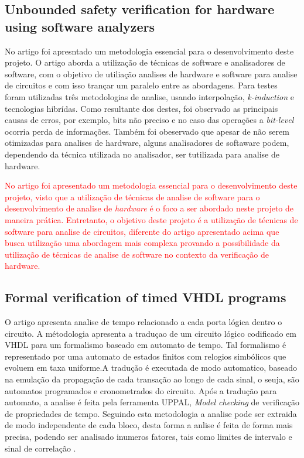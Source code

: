 \subsection{Unbounded safety verification for hardware using software analyzers}
No artigo foi apresntado um metodologia essencial para o desenvolvimento deste projeto. O artigo aborda a utilização de técnicas de software e analisadores de software, com o objetivo de utiliação analises de hardware e software para analise de circuitos e com isso trançar um paralelo entre as abordagens. Para testes foram utilizadas três metodologias de analise, usando interpolação, \textit{k-induction} e tecnologias hibrídas. Como resultante dos destes, foi observado as principais causas de erros, por exemplo, bits não preciso e no caso das operações a \textit{bit-level} ocorria perda de informações. Também foi obeservado que apesar de não serem otimizadas para analises de hardware, alguns analisadores de softaware podem, dependendo da técnica utilizada no analisador,  ser tutilizada para analise de hardware\cite{mukherjee2016unbounded}.

\par
\textcolor{red}{No artigo foi apresentado um metodologia essencial para o desenvolvimento deste projeto, visto que a utilização de técnicas de analise de software para o desenvolvimento de analise de \textit{hardware} é o foco a ser abordado neste projeto de maneira prática. Entretanto, o objetivo deste projeto é a utilização de técnicas de software para analise de circuitos, diferente do artigo apresentado acima que busca utilização uma abordagem mais complexa provando a possibilidade da utilização de técnicas de analise de software no contexto da verificação de hardware.}

\subsection{Formal verification of timed VHDL programs}
O artigo apresenta analise de tempo relacionado a cada porta lógica dentro o circuito. A métodologia apresenta a traduçao de um circuito lógico codificado em VHDL para um formalismo baseado em automato de tempo. Tal formalismo é representado por uma automato de estados finitos com relogios simbólicos que evoluem em taxa uniforme.A tradução é executada de modo automatico, baseado na emulação da propagação de cada transação ao longo de cada sinal, o seuja, são automatos programados e cronometrados do circuito. Após a tradução para automato, a analise é feita pela ferramenta UPPAL, \textit{Model checking} de verificação de propriedades de tempo. Seguindo esta metodologia a analise pode ser extraida de modo independente de cada bloco, desta forma a anlise é feita de forma mais precisa, podendo ser analisado inumeros fatores, tais como limites de intervalo e sinal de correlação \cite{bara2010formal}.

